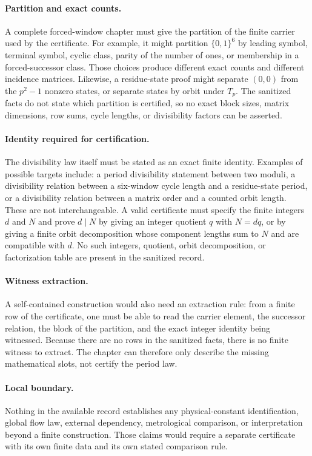\paragraph{Partition and exact counts.}
A complete forced-window chapter must give the partition of the finite carrier used by the certificate. For example, it might partition $\{0,1\}^6$ by leading symbol, terminal symbol, cyclic class, parity of the number of ones, or membership in a forced-successor class. Those choices produce different exact counts and different incidence matrices. Likewise, a residue-state proof might separate $(0,0)$ from the $p^2-1$ nonzero states, or separate states by orbit under $T_p$. The sanitized facts do not state which partition is certified, so no exact block sizes, matrix dimensions, row sums, cycle lengths, or divisibility factors can be asserted.

\paragraph{Identity required for certification.}
The divisibility law itself must be stated as an exact finite identity. Examples of possible targets include: a period divisibility statement between two moduli, a divisibility relation between a six-window cycle length and a residue-state period, or a divisibility relation between a matrix order and a counted orbit length. These are not interchangeable. A valid certificate must specify the finite integers $d$ and $N$ and prove $d\mid N$ by giving an integer quotient $q$ with $N=dq$, or by giving a finite orbit decomposition whose component lengths sum to $N$ and are compatible with $d$. No such integers, quotient, orbit decomposition, or factorization table are present in the sanitized record.

\paragraph{Witness extraction.}
A self-contained construction would also need an extraction rule: from a finite row of the certificate, one must be able to read the carrier element, the successor relation, the block of the partition, and the exact integer identity being witnessed. Because there are no rows in the sanitized facts, there is no finite witness to extract. The chapter can therefore only describe the missing mathematical slots, not certify the period law.

\paragraph{Local boundary.}
Nothing in the available record establishes any physical-constant identification, global flow law, external dependency, metrological comparison, or interpretation beyond a finite construction. Those claims would require a separate certificate with its own finite data and its own stated comparison rule.